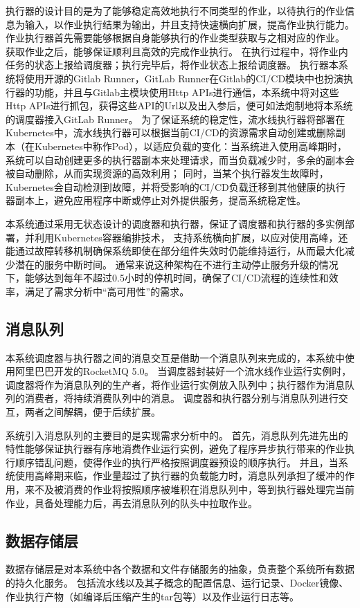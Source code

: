 执行器的设计目的是为了能够稳定高效地执行不同类型的作业，以待执行的作业信息为输入，以作业执行结果为输出，并且支持快速横向扩展，提高作业执行能力。
作业执行器首先需要能够根据自身能够执行的作业类型获取与之相对应的作业。
获取作业之后，能够保证顺利且高效的完成作业执行。
在执行过程中，将作业内任务的状态上报给调度器；执行完毕后，将作业状态上报给调度器。
执行器本系统将使用开源的Gitlab Runner，GitLab Runner在Gitlab的CI/CD模块中也扮演执行器的功能，并且与Gitlab主模块使用Http APIs进行通信，本系统中将对这些Http APIs进行抓包，获得这些API的Url以及出入参后，便可如法炮制地将本系统的调度器接入GitLab Runner。
为了保证系统的稳定性，流水线执行器将部署在Kubernetes中，流水线执行器可以根据当前CI/CD的资源需求自动创建或删除副本（在Kubernetes中称作Pod），以适应负载的变化：当系统进入使用高峰期时，系统可以自动创建更多的执行器副本来处理请求，而当负载减少时，多余的副本会被自动删除，从而实现资源的高效利用；
同时，当某个执行器发生故障时，Kubernetes会自动检测到故障，并将受影响的CI/CD负载迁移到其他健康的执行器副本上，避免应用程序中断或停止对外提供服务，提高系统稳定性。

本系统通过采用无状态设计的调度器和执行器，保证了调度器和执行器的多实例部署，并利用Kubernetes容器编排技术，
支持系统横向扩展，以应对使用高峰，还能通过故障转移机制确保系统即使在部分组件失效时仍能维持运行，从而最大化减少潜在的服务中断时间。
通常来说这种架构在不进行主动停止服务升级的情况下，能够达到每年不超过0.5小时的停机时间，确保了CI/CD流程的连续性和效率，满足了需求分析中“高可用性”的需求。

\subsection{消息队列}

本系统调度器与执行器之间的消息交互是借助一个消息队列来完成的，本系统中使用阿里巴巴开发的RocketMQ 5.0。
当调度器封装好一个流水线作业运行实例时，调度器将作为消息队列的生产者，将作业运行实例放入队列中；执行器作为消息队列的消费者，将持续消费队列中的消息。
调度器和执行器分别与消息队列进行交互，两者之间解耦，便于后续扩展。

系统引入消息队列的主要目的是实现需求分析中的。
首先，消息队列先进先出的特性能够保证执行器有序地消费作业运行实例，避免了程序异步执行带来的作业执行顺序错乱问题，使得作业的执行严格按照调度器预设的顺序执行。
并且，当系统使用高峰期来临，作业量超过了执行器的负载能力时，消息队列承担了缓冲的作用，来不及被消费的作业将按照顺序被堆积在消息队列中，等到执行器处理完当前作业，具备处理能力后，再去消息队列的队头中拉取作业。

\subsection{数据存储层}
数据存储层是对本系统中各个数据和文件存储服务的抽象，负责整个系统所有数据的持久化服务。
包括流水线以及其子概念的配置信息、运行记录、Docker镜像、作业执行产物（如编译后压缩产生的tar包等）以及作业运行日志等。

